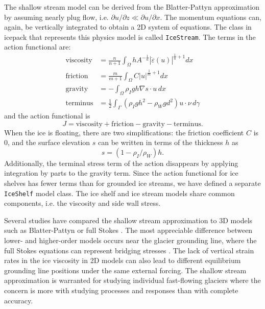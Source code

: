 \documentclass[journal abbreviation, manuscript]{copernicus}
\begin{document}
The shallow stream model can be derived from the Blatter-Pattyn approximation by assuming nearly plug flow, i.e. $\partial u/\partial z \ll \partial u/\partial x$.
The momentum equations can, again, be vertically integrated to obtain a 2D system of equations.
The class in icepack that represents this physics model is called \texttt{IceStream}.
The terms in the action functional are:
\begin{align}
    \text{viscosity} & = \frac{n}{n + 1}\int_\Omega hA^{-\frac{1}{n}}|\dot\varepsilon(u)|^{\frac{1}{n} + 1}dx \\
    \text{friction} & = \frac{m}{m + 1}\int_\Omega C|u|^{\frac{1}{m} + 1}dx \\
    \text{gravity} & = -\int_\Omega\rho_I gh\nabla s\cdot u\,dx \\
    \text{terminus} & = \frac{1}{2}\int_\Gamma(\rho_I gh^2 - \rho_Wgd^2)u\cdot \nu\,d\gamma
\end{align}
and the action functional is
\begin{equation}
    J = \text{viscosity} + \text{friction} - \text{gravity} - \text{terminus}.
\end{equation}
When the ice is floating, there are two simplifications: the friction coefficient $C$ is 0, and the surface elevation $s$ can be written in terms of the thickness $h$ as
\begin{equation}
    s = (1 - \rho_I / \rho_W)h.
\end{equation}
Additionally, the terminal stress term of the action disappears by applying integration by parts to the gravity term.
Since the action functional for ice shelves has fewer terms than for grounded ice streams, we have defined a separate \texttt{IceShelf} model class.
The ice shelf and ice stream models share common components, i.e. the viscosity and side wall stress.

Several studies have compared the shallow stream approximation to 3D models such as Blatter-Pattyn or full Stokes \citep{pattyn2013grounding}.
The most appreciable difference between lower- and higher-order models occurs near the glacier grounding line, where the full Stokes equations can represent bridging stresses \citep{van2013fundamentals}.
The lack of vertical strain rates in the ice viscosity in 2D models can also lead to different equilibrium grounding line positions under the same external forcing.
The shallow stream approximation is warranted for studying individual fast-flowing glaciers where the concern is more with studying processes and responses than with complete accuracy.
\end{document}

